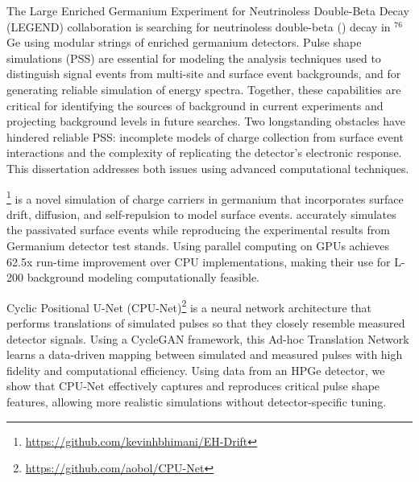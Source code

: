 The Large Enriched Germanium Experiment for Neutrinoless Double-Beta Decay (LEGEND) collaboration is searching for neutrinoless double-beta ({\onbb}) decay in ${}^{76}$Ge using modular strings of enriched germanium detectors. Pulse shape simulations (PSS) are essential for modeling the analysis techniques used to distinguish signal events from multi-site and surface event backgrounds, and for generating reliable simulation of energy spectra. Together, these capabilities are critical for identifying the sources of background in current experiments and projecting background levels in future searches. Two longstanding obstacles have hindered reliable PSS: incomplete models of charge collection from surface event interactions and the complexity of replicating the detector’s electronic response. This dissertation addresses both issues using advanced computational techniques.

{\ehd}\footnote{\url{https://github.com/kevinhbhimani/EH-Drift}} is a novel simulation of charge carriers in germanium that incorporates surface drift, diffusion, and self-repulsion to model surface events. {\ehd} accurately simulates the passivated surface events while reproducing the experimental results from Germanium detector test stands. Using parallel computing on GPUs {\ehd} achieves 62.5x run-time improvement over CPU implementations, making their use for L-200 background modeling computationally feasible.

Cyclic Positional U-Net (CPU-Net)\footnote{\url{https://github.com/aobol/CPU-Net}} is a neural network architecture that performs translations of simulated pulses so that they closely resemble measured detector signals. Using a CycleGAN framework, this Ad-hoc Translation Network learns a data-driven mapping between simulated and measured pulses with high fidelity and computational efficiency. Using data from an HPGe detector, we show that CPU-Net effectively captures and reproduces critical pulse shape features, allowing more realistic simulations without detector-specific tuning.